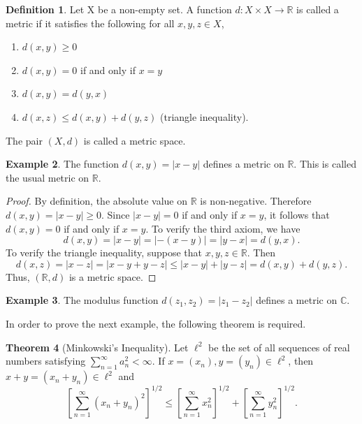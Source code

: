 \documentclass[11pt,a4paper]{article}
\theoremstyle{definition}
\newtheorem{thm}{Theorem}[subsection]
\newtheorem{defn}[thm]{Definition}
\newtheorem{exa}[thm]{Example}
\begin{document}
\begin{defn}
Let X be a non-empty set. A function $d:X\times X\rightarrow \mathbb{R}$ is called a metric if it satisfies the following for all $x,y,z\in X$,
\begin{enumerate}
\item[i] $d(x,y)\geq 0$
\item[ii] $d(x,y)=0$ if and only if $x=y$
\item[iii] $d(x,y)=d(y,x)$
\item[iv] $d(x,z)\leq d(x,y)+d(y,z)$ (triangle inequality).
\end{enumerate}

The pair $(X,d)$ is called a metric space.
\end{defn}




\begin{exa}
The function $d(x,y)=|x-y|$ defines a metric on $\mathbb{R}$. This is called the usual metric on $\mathbb{R}$.
\end{exa}
\begin{proof}
By definition, the absolute value on $\mathbb{R}$ is non-negative. Therefore $d(x,y)=|x-y|\geq 0$. Since $|x-y|=0$ if and only if $x=y$, it follows that $d(x,y)=0$ if and only if $x=y$. To verify the third axiom, we have
$$d(x,y)=|x-y|=|-(x-y)|=|y-x|=d(y,x).$$
To verify the triangle inequality, suppose that $x,y,z\in \mathbb{R}$. Then
$$d(x,z)=|x-z|=|x-y+y-z|\leq |x-y|+|y-z|=d(x,y)+d(y,z).$$
Thus, $(\mathbb{R},d)$ is a metric space.
\end{proof}




\begin{exa}
The modulus function $d(z_1,z_2)=|z_1-z_2|$ defines a metric on $\mathbb{C}$.
\end{exa}

In order to prove the next example, the following theorem is required.



\begin{thm}[Minkowski's Inequality]
Let $\ell^2$ be the set of all sequences of real numbers satisfying $\sum^{\infty}_{n=1} a^2_n < \infty$. If $x=(x_n), y=(y_n) \in \ell^2$, then $x+y=(x_n+y_n)\in \ell^2$ and
$$\left[\sum\limits^{\infty}_{n=1} (x_n+y_n)^2\right]^{1/2} \leq \left[\sum\limits_{n=1}^{\infty} x^2_n\right]^{1/2}+\left[\sum\limits_{n=1}^{\infty} y^2_n\right]^{1/2}.$$
\end{thm}
\end{document}
